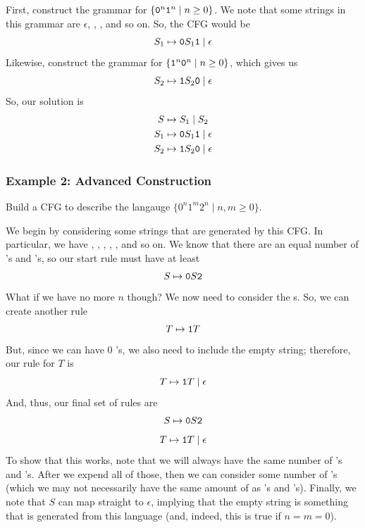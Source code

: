 \documentclass[letterpaper]{article}
\begin{document}
\begin{mdframed}[]
    First, construct the grammar for $\{\texttt{0}^n \texttt{1}^n \mid n \geq 0\}$. We note that some strings in this grammar are $\epsilon$, , , and so on. So, the CFG would be  
    \[S_1 \mapsto \texttt{0}S_1 \texttt{1} \mid \epsilon\]
    Likewise, construct the grammar for $\{\texttt{1}^n \texttt{0}^n \mid n \geq 0\}$, which gives us 
    \[S_2 \mapsto \texttt{1}S_2 \texttt{0} \mid \epsilon\]
    So, our solution is 
    \begin{equation*}
        \begin{aligned}
            S &\mapsto S_1 \mid S_2 \\ 
            S_1 &\mapsto \texttt{0}S_1 \texttt{1} \mid \epsilon \\ 
            S_2 &\mapsto \texttt{1}S_2 \texttt{0} \mid \epsilon
        \end{aligned}
    \end{equation*}
\end{mdframed}

\subsubsection{Example 2: Advanced Construction}
Build a CFG to describe the langauge $\{0^n 1^m 2^n \mid n, m \geq 0\}$.

\begin{mdframed}[]
    We begin by considering some strings that are generated by this CFG. In particular, we have , , , , , and so on. We know that there are an equal number of 's and 's, so our start rule must have at least 
    \[S \mapsto \texttt{0}S\texttt{2}\]
    What if we have no more $n$ though? We now need to consider the s. So, we can create another rule 
    \[T \mapsto \texttt{1}T\] 
    But, since we can have 0 's, we also need to include the empty string; therefore, our rule for $T$ is 
    \[T \mapsto \texttt{1}T \mid \epsilon\]
    And, thus, our final set of rules are 
    \[S \mapsto \texttt{0}S\texttt{2}\]
    \[T \mapsto \texttt{1}T \mid \epsilon\]
    To show that this works, note that we will always have the same number of 's and 's. After we expend all of those, then we can consider some number of 's (which we may not necessarily have the same amount of as 's and 's). Finally, we note that $S$ can map straight to $\epsilon$, implying that the empty string is something that is generated from this language (and, indeed, this is true if $n = m = 0$).
\end{mdframed}
\end{document}
